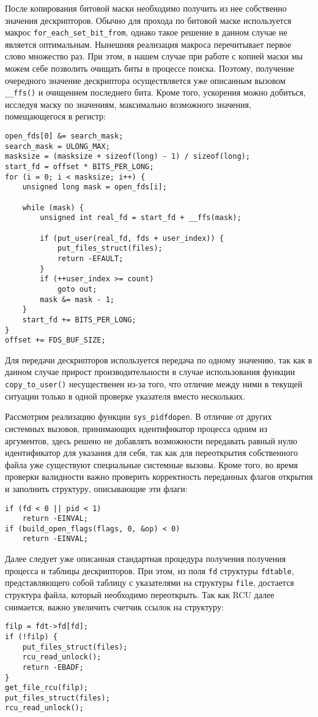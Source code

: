 После копирования битовой маски необходимо получить из нее собственно значения
дескрипторов. Обычно для прохода по битовой маске используется макрос
\texttt{for\_each\_set\_bit\_from}, однако такое решение в данном случае не
является оптимальным. Нынешняя реализация макроса перечитывает первое слово
множество раз. При этом, в нашем случае при работе с копией маски мы можем себе
позволить очищать биты в процессе поиска. Поэтому, получение очередного значение
дескриптора осуществляется уже описанным вызовом \texttt{\_\_ffs()} и очищением
последнего бита. Кроме того, ускорения можно добиться, исследуя маску по
значениям, максимально возможного значения, помещающегося в регистр:
\medskip
\begin{lstlisting}[style=cstyle]
open_fds[0] &= search_mask;
search_mask = ULONG_MAX;
masksize = (masksize + sizeof(long) - 1) / sizeof(long);
start_fd = offset * BITS_PER_LONG;
for (i = 0; i < masksize; i++) {
	unsigned long mask = open_fds[i];

	while (mask) {
		unsigned int real_fd = start_fd + __ffs(mask);

		if (put_user(real_fd, fds + user_index)) {
			put_files_struct(files);
			return -EFAULT;
		}
		if (++user_index >= count)
			goto out;
		mask &= mask - 1;
	}
	start_fd += BITS_PER_LONG;
}
offset += FDS_BUF_SIZE;
\end{lstlisting}
\medskip

Для передачи дескрипторов используется передача по одному значению, так как
в данном случае прирост производительности в случае использования функции
\texttt{copy\_to\_user()} несущественен из-за того, что отличие между ними в
текущей ситуации только в одной проверке указателя вместо нескольких.

Рассмотрим реализацию функции \texttt{sys\_pidfdopen}. В отличие от других
системных вызовов, принимающих идентификатор процесса одним из
аргументов, здесь решено не добавлять возможности передавать равный нулю
идентификатор для указания для себя, так как для переоткрытия собственного файла
уже существуют специальные системные вызовы. Кроме того, во время проверки
валидности важно проверить корректность переданных флагов открытия и заполнить
структуру, описывающие эти флаги:
\medskip
\begin{lstlisting}[style=cstyle]
if (fd < 0 || pid < 1)
	return -EINVAL;
if (build_open_flags(flags, 0, &op) < 0)
	return -EINVAL;
\end{lstlisting}
\medskip

Далее следует уже описанная стандартная процедура получения получения процесса и
таблицы дескрипторов. При этом, из поля \texttt{fd} структуры \texttt{fdtable},
представляющего собой таблицу с указателями на структуры \texttt{file},
достается структура файла, который необходимо переоткрыть. Так как RCU далее
снимается, важно увеличить счетчик ссылок на структуру:
\medskip
\begin{lstlisting}[style=cstyle]
filp = fdt->fd[fd];
if (!filp) {
	put_files_struct(files);
	rcu_read_unlock();
	return -EBADF;
}
get_file_rcu(filp);
put_files_struct(files);
rcu_read_unlock();
\end{lstlisting}
\medskip

